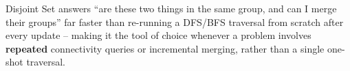 \begin{takeawaybox}
Disjoint Set answers ``are these two things in the same group, and can
I merge their groups'' far faster than re-running a DFS/BFS traversal
from scratch after every update -- making it the tool of choice
whenever a problem involves \textbf{repeated} connectivity queries or
incremental merging, rather than a single one-shot traversal.
\end{takeawaybox}
